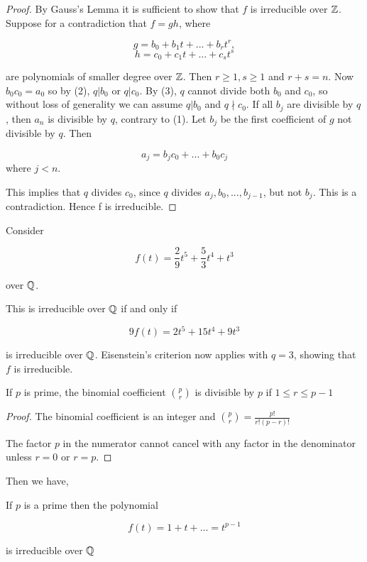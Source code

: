 \begin{proof}
By Gauss's Lemma it is sufficient to show that $f$ is irreducible over $\mathbb Z$. Suppose for a contradiction that $f = gh$, where

$$
g=b_0+b_1 t+ ... +b_r t^r,
$$
$$
h=c_0+c_1 t+ ... +c_s t^s
$$

are polynomials of smaller degree over $\mathbb Z$. Then $r \ge 1, s \ge 1$ and $r+s = n$. Now $b_0 c_0 = a_0$ so by (2), $q | b_0$ or $q|c_0$. By (3), $q$ cannot divide both $b_0$ and $c_0$, so without
loss of generality we can assume $q | b_0$ and $q \nmid c_0$. If all $b_j$ are divisible by $q$, then $a_n$ is divisible by $q$, contrary to (1). Let $b_j$ be the first coefficient of $g$ not divisible by $q$. Then

$$
a_j = b_j c_0 + ...+ b_0 c_j
$$
where $j < n$.

 This implies that $q$ divides $c_0$, since $q$ divides $a_j, b_0,..., b_{j-1}$, but not $b_j$. This is a contradiction. Hence f is irreducible.
\end{proof}

\begin{example}
Consider

$$
f(t) = \frac{2}{9} t^5 + \frac{5}{3} t^4 + t^3 
$$

over $\mathbb Q$.

This is irreducible over $\mathbb Q$ if and only if

$$
9f(t) = 2t^5 + 15t^4 + 9t^3
$$

is irreducible over $\mathbb Q$. Eisenstein's criterion now applies with $q = 3$, showing that $f$ is irreducible.
\end{example}

\begin{theorem}
If $p$ is prime, the binomial coefficient $\binom{p}{r}$ is divisible by $p$ if $1 \le r \le p-1$
\end{theorem}

\begin{proof}
The binomial coefficient is an integer and $\binom{p}{r} = \frac{p!}{r!(p-r)!}$

The factor $p$ in the numerator cannot cancel with any factor in the denominator unless $r=0$ or $r=p$.
\end{proof}

Then we have,

\begin{theorem}
    If $p$ is a prime then the polynomial

    $$
    f(t) = 1 + t + ... = t^{p-1}
    $$

    is irreducible over $\mathbb Q$
\end{theorem}

